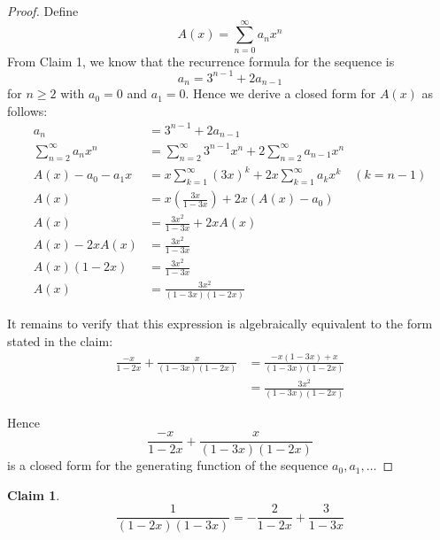 \documentclass{article}
\newtheorem{claim}{Claim}
\begin{document}
\begin{proof}
    Define
    \[
    A(x) = \sum_{n=0}^{\infty}a_nx^n
    \]
    From Claim 1, we know that the recurrence formula for the sequence is
    \[
    a_n = 3^{n-1} + 2a_{n-1}
    \]
    for $n \ge 2$ with $a_0 = 0$ and $a_1 = 0$. Hence we derive a closed form for $A(x)$ as follows:
    \[
    \begin{aligned}
    a_n &= 3^{n-1} + 2a_{n-1} \\
    \sum_{n=2}^{\infty}a_nx^n &= \sum_{n=2}^{\infty}3^{n-1}x^n + 2\sum_{n=2}^{\infty}a_{n-1}x^n \\
    A(x) - a_0 - a_1x &= x\sum_{k=1}^{\infty}(3x)^k + 2x\sum_{k=1}^{\infty}a_kx^k \quad (k = n - 1) \\
    A(x) &= x\left(\frac{3x}{1 - 3x}\right) + 2x(A(x) - a_0) \\
    A(x) &= \frac{3x^2}{1 - 3x} + 2xA(x) \\
    A(x) - 2xA(x) &= \frac{3x^2}{1 - 3x} \\
    A(x)(1 - 2x) &= \frac{3x^2}{1 - 3x} \\
    A(x) &= \frac{3x^2}{(1 - 3x)(1 - 2x)}
    \end{aligned}
    \]

    \medskip

    It remains to verify that this expression is algebraically equivalent to the form stated in the claim:
    \[
    \begin{aligned}
    \frac{-x}{1 - 2x} + \frac{x}{(1 - 3x)(1 - 2x)} &= \frac{-x(1 - 3x) + x}{(1 - 3x)(1 - 2x)} \\
    &= \frac{3x^2}{(1 - 3x)(1 - 2x)}
    \end{aligned}
    \]

    \medskip

    Hence
    \[
    \frac{-x}{1 - 2x} + \frac{x}{(1 - 3x)(1 - 2x)}
    \]
    is a closed form for the generating function of the sequence $a_0, a_1, \dots$
\end{proof}

\begin{claim}
    \[
    \frac{1}{(1 - 2x)(1 - 3x)} = -\frac{2}{1 - 2x} + \frac{3}{1 - 3x}
    \]
\end{claim}
\end{document}
